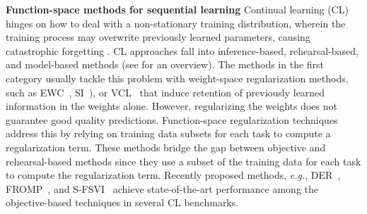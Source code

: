 \documentclass{article}
\makeatletter
\newcommand{\eg}{\textit{e.g.\@}\xspace}
\makeatother
\begin{document}

\textbf{Function-space methods for sequential learning} 
Continual learning (CL) hinges on how to deal with a non-stationary training distribution, wherein the training process may overwrite previously learned parameters, causing catastrophic forgetting \citep{mccloskey1989catastrophic}. CL approaches fall into inference-based, rehearsal-based, and model-based methods (see \cite{parisi2019continual, de2021continual} for an overview). The methods in the first category usually tackle this problem with weight-space regularization methods, such as EWC~\citep{kirkpatrick2017overcoming}, SI~\citep{zenke17a}), or VCL~\citep{nguyen-tuongModel2009} that induce retention of previously learned information in the weights alone. However, regularizing the weights does not guarantee good quality predictions. Function-space regularization techniques~\cite{li2018lwf, benjamin2018measuring, titsias2019functional, buzzega2020dark, pan2020continual, rudner2022continual} address this by relying on training data subsets for each task to compute a regularization term. These methods bridge the gap between objective and rehearsal-based methods  since they use a subset of the training data for each task to compute the regularization term. Recently proposed methods, \eg, DER~\citep{buzzega2020dark}, FROMP~\citep{pan2020continual}, and S-FSVI~\citep{rudner2022continual} achieve state-of-the-art performance among the objective-based techniques in several CL benchmarks. 
\end{document}
